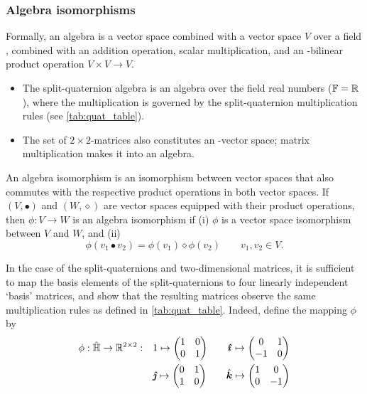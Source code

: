 \subsubsection{Algebra isomorphisms} Formally, an algebra is a vector space combined with a vector space \(V\) over a field \field, combined with an addition operation, scalar multiplication, and an \field-bilinear product operation \(V\times V \to V\). \cite{Schuller2014}
\begin{itemize}
    \item The split-quaternion algebra is an algebra over the field real numbers (\(\mathbb{F} = \mathbb{R}\)), where the multiplication is governed by the split-quaternion multiplication rules (see \cref{tab:quat_table}).
    \item The set of \(2\times2\)-matrices also constitutes an \real-vector space; matrix multiplication makes it into an algebra.
\end{itemize}

An algebra isomorphism is an isomorphism between vector spaces that also commutes with the respective product operations in both vector spaces. If \((V, \bullet)\) and \((W, \diamond)\) are vector spaces equipped with their product operations, then \(\phi: V \to W\) is an algebra isomorphism if (i) \(\phi\) is a vector space isomorphism between \(V\) and \(W\), and (ii) \cite{Lang2002}
\begin{equation}
     \phi(v_1 \bullet v_2) = \phi(v_1)\diamond\phi(v_2) \qquad v_1, v_2 \in V.
\end{equation}

In the case of the split-quaternions and two-dimensional matrices, it is sufficient to map the basis elements of the split-quaternions to four linearly independent `basis' matrices, and show that the resulting matrices observe the same multiplication rules as defined in \cref{tab:quat_table}. Indeed, define the mapping \(\phi\) by 
\begin{equation}
    \begin{split}
        \phi: \spquaternions \to \real^{2\times2}: \quad &  
         1 \mapsto  \mqty(1 & 0 \\ 0 & 1) \qquad
        \quati \mapsto  \mqty(0 & 1 \\  -1 & 0) \\
        & \quatj \mapsto  \mqty(0 & 1 \\  1 & 0)\qquad 
        \quatk \mapsto  \mqty(1 & 0 \\  0 & -1) \\
    \end{split}
    \label{eq:basis_elements}
\end{equation}

